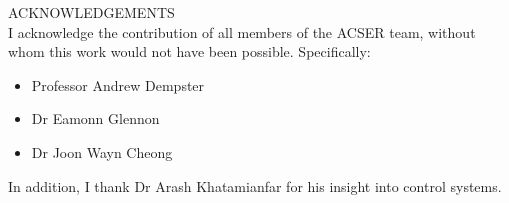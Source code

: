 ACKNOWLEDGEMENTS\\
I acknowledge the contribution of all members of the ACSER team, without whom this work would not have been possible. Specifically:\\
\begin{itemize}
\item{Professor Andrew Dempster}\\
\item{Dr Eamonn Glennon}\\
\item{Dr Joon Wayn Cheong}\\

\end{itemize}
In addition, I thank Dr Arash Khatamianfar for his insight into control systems.
